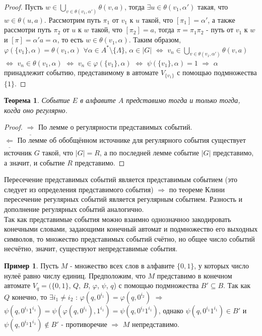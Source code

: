 \documentclass[a4paper, 12pt]{article}
\renewcommand{\phi}{\varphi}
\theoremstyle{definition}
\newtheorem*{example1}{Пример}
\theoremstyle{plain}
\newtheorem*{theorem}{Теорема}
\theoremstyle{remark}
\begin{document}
\begin{proof}
    Пусть $w\in\bigcup\limits_{v\in\theta(v_1,\alpha')}\theta(v,a)$, тогда $\exists u\in\theta(v_1,\alpha')$ такая, что $w\in\theta(u,a)$. Рассмотрим путь $\pi_1$ от $v_1$ к $u$ такой, что $[\pi_1]=\alpha'$, а также рассмотри путь $\pi_2$ от $u$ к $w$ такой, что $[\pi_2]=a$, тогда $\pi=\pi_1\pi_2$ - путь от $v_1$ к $w$ и $[\pi]=\alpha'a=\alpha$, то есть $w\in\theta(v_1,\alpha)$.
    Таким образом, $\phi(\{v_1\},\alpha)=\theta(v_1,\alpha)$ $\forall\alpha\in A^*\setminus\{\Lambda\}$, $\alpha\in|G|$ $\Leftrightarrow$ $v_n\in\bigcup\limits_{v\in\theta(v_1,\alpha')}\theta(v,a)$ $\Leftrightarrow$ $v_n\in\theta(v_1,\alpha)$ $\Leftrightarrow$ $v_n\in\phi(\{v_1\},\alpha)$ $\Leftrightarrow$ $\psi(\{v_1\},\alpha)=1$ $\Longrightarrow$ $\alpha$ принадлежит событию, представимому в автомате $V_{\{v_1\}}$ с помощью подмножества $\{1\}$.
  \end{proof}
  \begin{theorem}
    Событие $E$ в алфавите $A$ представимо тогда и только тогда, когда оно регулярно.
  \end{theorem}
  \begin{proof}
    $\underline{\Longrightarrow}$ По лемме о регулярности представимых событий.\\
    $\underline{\Longleftarrow}$ По лемме об обобщённом источнике для регулярного события существует источник $G$ такой, что $|G|=R$, а по последней лемме событие $|G|$ представимо, а значит, и событие $R$ представимо.
  \end{proof}
  Пересечение представимых событий является представимым событием (это следует из определения представимого события) $\Longrightarrow$ по теореме Клини пересечение регулярных событий является регулярным событием. Разность и дополнение регулярных событий аналогично.\\
  Так как представимые события можно взаимно однозначноо закодировать конечными словами, задающими конечный автомат и подмножество его выходных символов, то множество представимых событий счётно, но общее число событий несчётно, значит, существуют непредставимые события.\\
  \begin{example1}
    Пусть $M$ - множество всех слов в алфавите $\{0,1\}$, у которых число нулеё равно числу единиц. Предположим, что $M$ представимо в конечном автомате $V_q=(\{0,1\}$, $Q$, $B$, $\phi$, $\psi$, $q$) с помощью подмножества $B'\subseteq B$. Так как $Q$ конечно, то $\exists i_1\neq i_2$ : $\phi(q,0^{i_1})=\phi(q,0^{i_2})$ $\Longrightarrow$ $\psi(q,0^{i_1}1^{i_1})=\psi(\phi(q,0^{i_1}),1^{i_1})=\psi(q,0^{i_2}1^{i_1})$, однако $\psi(q,0^{i_1}1^{i_1})\in B'$ и $\psi(q,0^{i_2}1^{i_1})\notin B'$ - противоречие $\Longrightarrow$ $M$ непредставимо.
  \end{example1}
\end{document}
